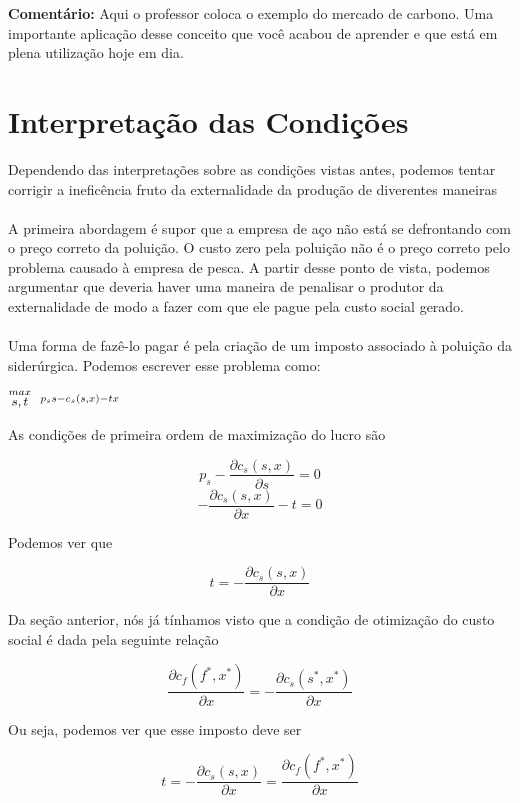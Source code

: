 \documentclass[a4paper,11pt,oneside]{book}
\theoremstyle{definition}
\theoremstyle{break}
\begin{document}
\textbf{Comentário: } Aqui o professor coloca o exemplo do mercado de carbono. Uma importante aplicação desse conceito que você acabou de aprender e que está em plena utilização hoje em dia.

\section{Interpretação das Condições}

Dependendo das interpretações sobre as condições vistas antes, podemos tentar corrigir a ineficência fruto da externalidade da produção de diverentes maneiras
\\~\\
A primeira abordagem é supor que a empresa de aço não está se defrontando com o preço correto da poluição. O custo zero pela poluição não é o preço correto pelo problema causado à empresa de pesca. A partir desse ponto de vista, podemos argumentar que deveria haver uma maneira de penalisar o produtor da externalidade de modo a fazer com que ele pague pela custo social gerado.
\\~\\
Uma forma de fazê-lo pagar é pela criação de um imposto associado à poluição da siderúrgica. Podemos escrever esse problema como:

\begin{center}
	\LARGE $ \stackrel{max}{\text{\small $s,t$}} \ \ %
	\stackrel{p_ss - c_s(s,x) - tx}{\ } $ %
\end{center}

As condições de primeira ordem de maximização do lucro são

$$ p_s - \frac{\partial c_s(s,x)}{\partial s} = 0 $$
$$ - \frac{\partial c_s(s,x)}{\partial x} - t = 0 $$

Podemos ver que

$$ t = - \frac{\partial c_s(s,x)}{\partial x} $$

Da seção anterior, nós já tínhamos visto que a condição de otimização do custo social é dada pela seguinte relação 

$$\frac{\partial c_f(f^*,x^*)}{\partial x} = - \frac{\partial c_s(s^*,x^*)}{\partial x} $$

Ou seja, podemos ver que esse imposto deve ser

$$ t = - \frac{\partial c_s(s,x)}{\partial x} = \frac{\partial c_f(f^*,x^*)}{\partial x} $$
\end{document}
